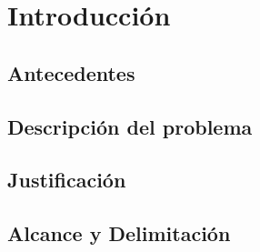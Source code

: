 \chapter{Introducción}
\section{Antecedentes}
\section{Descripción del problema}
\section{Justificación}
\section{Alcance y Delimitación}